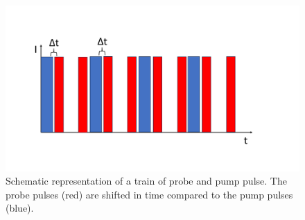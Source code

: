 \begin{figure}[ht]
    \centering
    \includegraphics[width = 13cm]{Bilder/Grundlagen/PulseTrain.pdf}    
    \caption{Schematic representation of a train of probe and pump pulse. The probe pulses (red) are shifted in time compared to the pump pulses (blue).}
    \label{fig:PulseTrain}
\end{figure}

